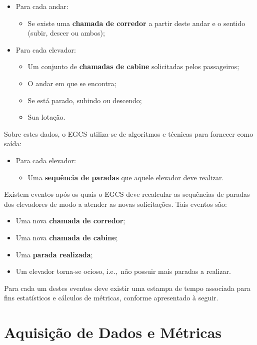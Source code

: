 \begin{itemize}
  \item Para cada andar:
  \begin{itemize}
    \item Se existe uma \textbf{chamada de corredor} a partir deste andar e o
          sentido (subir, descer ou ambos);
  \end{itemize}
  \item Para cada elevador:
  \begin{itemize}
    \item Um conjunto de \textbf{chamadas de cabine} solicitadas pelos
          passageiros;
    \item O andar em que se encontra;
    \item Se está parado, subindo ou descendo;
    \item Sua lotação.
  \end{itemize}
\end{itemize}

Sobre estes dados, o EGCS utiliza-se de algoritmos e técnicas para fornecer como
saída:

\begin{itemize}
  \item Para cada elevador:
  \begin{itemize}
    \item Uma \textbf{sequência de paradas} que aquele elevador deve realizar.
  \end{itemize}
\end{itemize}

Existem eventos após os quais o EGCS deve recalcular as sequências de paradas
dos elevadores de modo a atender as novas solicitações. Tais eventos são:

\begin{itemize}
  \item Uma nova \textbf{chamada de corredor};
  \item Uma nova \textbf{chamada de cabine};
  \item Uma \textbf{parada realizada};
  \item Um elevador torna-se ocioso, i.e.,~não possuir mais paradas a realizar.
\end{itemize}

Para cada um destes eventos deve existir uma estampa de tempo associada para
fins estatísticos e cálculos de métricas, conforme apresentado à seguir.

\section{Aquisição de Dados e Métricas}

